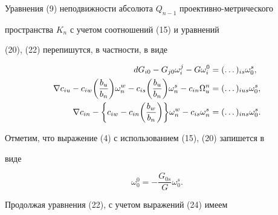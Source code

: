  


 


Уравнения (9) неподвижности абсолюта $Q_{n-1}$ проективно-метрического 


пространства $K_n$ с учетом соотношений (15) и уравнений 


(20), (22) перепишутся, в частности, в виде 


\begin{align} 


dG_{i0}-G_{j0}\omega^j_i-G\omega^0_i&=(\dotsc)_{is} 


\omega^s_0,\notag \\ 


\nabla c_{iu}-c_{iw}\bigg(\frac{b_u}{b_n} \bigg)\omega^w_n-c_{is} 


\bigg(\frac{b_u}{b_n} \bigg)\omega^s_n-c_{in} 


\Omega^n_u&=(\dotsc)_{ius}\omega^s_0,\\ 


\nabla c_{in}-\bigg\{c_{iw}-c_{in}\bigg(\frac{b_w}{b_n} \bigg) 


\bigg\}\omega^w_n-c_{is}\omega^s_n&=(\dotsc)_{ins}\omega^s_0.\notag 


\end{align} 


 


Отметим, что выражение (4) с использованием (15), (20) запишется в 


виде 


\begin{equation} 


\omega^0_0=-\frac{G_{0s}}{G}\omega^s_0. 


\end{equation} 


 


Продолжая уравнения (22), с учетом выражений (24) имеем 


